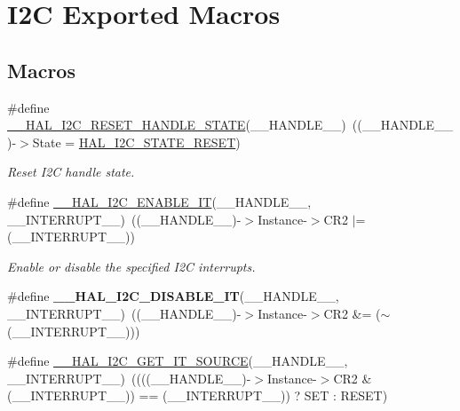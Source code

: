 \hypertarget{group___i2_c___exported___macros}{}\section{I2C Exported Macros}
\label{group___i2_c___exported___macros}
\subsection*{Macros}
\begin{DoxyCompactItemize}
\item 
\#define \hyperlink{group___i2_c___exported___macros_ga74c8fd72a78882720c28448ce8bd33d8}{\+\_\+\+\_\+\+H\+A\+L\+\_\+\+I2\+C\+\_\+\+R\+E\+S\+E\+T\+\_\+\+H\+A\+N\+D\+L\+E\+\_\+\+S\+T\+A\+TE}(\+\_\+\+\_\+\+H\+A\+N\+D\+L\+E\+\_\+\+\_\+)~((\+\_\+\+\_\+\+H\+A\+N\+D\+L\+E\+\_\+\+\_\+)-\/$>$State = \hyperlink{group___i2_c___exported___types_ggaef355af8eab251ae2a19ee164ad81c37a91ba08634e08d7287940f1bc5a37eeff}{H\+A\+L\+\_\+\+I2\+C\+\_\+\+S\+T\+A\+T\+E\+\_\+\+R\+E\+S\+ET})
\begin{DoxyCompactList}\small\item\em Reset I2C handle state. \end{DoxyCompactList}\item 
\#define \hyperlink{group___i2_c___exported___macros_gac9d8b249b06b2d30f987acc9ceebd1d9}{\+\_\+\+\_\+\+H\+A\+L\+\_\+\+I2\+C\+\_\+\+E\+N\+A\+B\+L\+E\+\_\+\+IT}(\+\_\+\+\_\+\+H\+A\+N\+D\+L\+E\+\_\+\+\_\+,  \+\_\+\+\_\+\+I\+N\+T\+E\+R\+R\+U\+P\+T\+\_\+\+\_\+)~((\+\_\+\+\_\+\+H\+A\+N\+D\+L\+E\+\_\+\+\_\+)-\/$>$Instance-\/$>$C\+R2 $\vert$= (\+\_\+\+\_\+\+I\+N\+T\+E\+R\+R\+U\+P\+T\+\_\+\+\_\+))
\begin{DoxyCompactList}\small\item\em Enable or disable the specified I2C interrupts. \end{DoxyCompactList}\item 
\mbox{\label{group___i2_c___exported___macros_ga33d0c7202ae298fa3ae128c5da49d455}} 
\#define {\bfseries \+\_\+\+\_\+\+H\+A\+L\+\_\+\+I2\+C\+\_\+\+D\+I\+S\+A\+B\+L\+E\+\_\+\+IT}(\+\_\+\+\_\+\+H\+A\+N\+D\+L\+E\+\_\+\+\_\+,  \+\_\+\+\_\+\+I\+N\+T\+E\+R\+R\+U\+P\+T\+\_\+\+\_\+)~((\+\_\+\+\_\+\+H\+A\+N\+D\+L\+E\+\_\+\+\_\+)-\/$>$Instance-\/$>$C\+R2 \&= ($\sim$(\+\_\+\+\_\+\+I\+N\+T\+E\+R\+R\+U\+P\+T\+\_\+\+\_\+)))
\item 
\#define \hyperlink{group___i2_c___exported___macros_ga932024bf4a259e0cdaf9e50b38e3d41a}{\+\_\+\+\_\+\+H\+A\+L\+\_\+\+I2\+C\+\_\+\+G\+E\+T\+\_\+\+I\+T\+\_\+\+S\+O\+U\+R\+CE}(\+\_\+\+\_\+\+H\+A\+N\+D\+L\+E\+\_\+\+\_\+,  \+\_\+\+\_\+\+I\+N\+T\+E\+R\+R\+U\+P\+T\+\_\+\+\_\+)~((((\+\_\+\+\_\+\+H\+A\+N\+D\+L\+E\+\_\+\+\_\+)-\/$>$Instance-\/$>$C\+R2 \& (\+\_\+\+\_\+\+I\+N\+T\+E\+R\+R\+U\+P\+T\+\_\+\+\_\+)) == (\+\_\+\+\_\+\+I\+N\+T\+E\+R\+R\+U\+P\+T\+\_\+\+\_\+)) ? S\+ET \+: R\+E\+S\+ET)

\end{DoxyCompactItemize}
